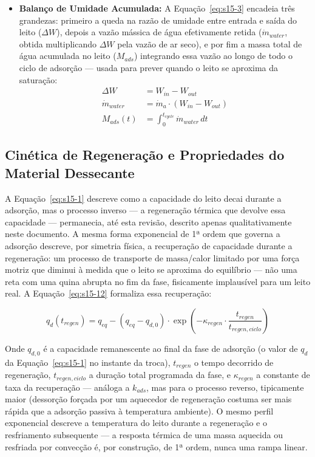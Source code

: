\documentclass[12pt,a4paper]{article}
\numberwithin{equation}{section}
\numberwithin{table}{section}
\numberwithin{figure}{section}
\begin{document}
\begin{itemize}
			\item \textbf{Balanço de Umidade Acumulada:} A Equação~\eqref{eq:s15-3} encadeia três grandezas: primeiro a queda na razão de umidade entre entrada e saída do leito ($\Delta W$), depois a vazão mássica de água efetivamente retida ($\dot{m}_{water}$, obtida multiplicando $\Delta W$ pela vazão de ar seco), e por fim a massa total de água acumulada no leito ($M_{ads}$) integrando essa vazão ao longo de todo o ciclo de adsorção — usada para prever quando o leito se aproxima da saturação:
			\begin{equation}\label{eq:s15-3}
			\begin{aligned}
				\Delta W &= W_{in} - W_{out} \\[4pt]
				\dot{m}_{water} &= \dot{m}_a \cdot (W_{in} - W_{out}) \\[4pt]
				M_{ads}(t) &= \int_0^{t_{cycle}} \dot{m}_{water} \, dt
			\end{aligned}
\end{equation}
		\end{itemize}

		\subsection{\textbf{Cinética de Regeneração e Propriedades do Material Dessecante}}

		A Equação~\eqref{eq:s15-1} descreve como a capacidade do leito decai durante a adsorção, mas o processo inverso — a regeneração térmica que devolve essa capacidade — permanecia, até esta revisão, descrito apenas qualitativamente neste documento. A mesma forma exponencial de 1ª ordem que governa a adsorção descreve, por simetria física, a recuperação de capacidade durante a regeneração: um processo de transporte de massa/calor limitado por uma força motriz que diminui à medida que o leito se aproxima do equilíbrio — não uma reta com uma quina abrupta no fim da fase, fisicamente implausível para um leito real. A Equação~\eqref{eq:s15-12} formaliza essa recuperação:

		\begin{equation}\label{eq:s15-12}
		q_d(t_{regen}) = q_{eq} - \left(q_{eq} - q_{d,0}\right) \cdot \exp\left(-\kappa_{regen} \cdot \frac{t_{regen}}{t_{regen,ciclo}}\right)
		\end{equation}

		Onde $q_{d,0}$ é a capacidade remanescente ao final da fase de adsorção (o valor de $q_d$ da Equação~\eqref{eq:s15-1} no instante da troca), $t_{regen}$ o tempo decorrido de regeneração, $t_{regen,ciclo}$ a duração total programada da fase, e $\kappa_{regen}$ a constante de taxa da recuperação — análoga a $k_{ads}$, mas para o processo reverso, tipicamente maior (dessorção forçada por um aquecedor de regeneração costuma ser mais rápida que a adsorção passiva à temperatura ambiente). O mesmo perfil exponencial descreve a temperatura do leito durante a regeneração e o resfriamento subsequente — a resposta térmica de uma massa aquecida ou resfriada por convecção é, por construção, de 1ª ordem, nunca uma rampa linear.
\end{document}
